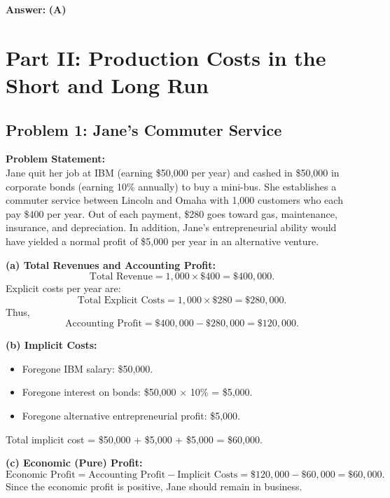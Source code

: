 \documentclass[12pt]{article}
\begin{document}
\textbf{Answer:} \textbf{(A)}

\section*{Part II: Production Costs in the Short and Long Run}

\subsection*{Problem 1: Jane's Commuter Service}
\textbf{Problem Statement:} \\
Jane quit her job at IBM (earning \$50,000 per year) and cashed in \$50,000 in corporate bonds (earning 10\% annually) to buy a mini-bus. She establishes a commuter service between Lincoln and Omaha with 1,000 customers who each pay \$400 per year. Out of each payment, \$280 goes toward gas, maintenance, insurance, and depreciation. In addition, Jane’s entrepreneurial ability would have yielded a normal profit of \$5,000 per year in an alternative venture.
\medskip

\textbf{(a) Total Revenues and Accounting Profit:} \\
\[
  \text{Total Revenue} = 1{,}000 \times \$400 = \$400{,}000.
\]
Explicit costs per year are:
\[
  \text{Total Explicit Costs} = 1{,}000 \times \$280 = \$280{,}000.
\]
Thus,
\[
  \text{Accounting Profit} = \$400{,}000 - \$280{,}000 = \$120{,}000.
\]
\medskip

\textbf{(b) Implicit Costs:} \\
\begin{itemize}[noitemsep]
  \item Foregone IBM salary: \$50,000.
  \item Foregone interest on bonds: \$50,000 $\times$ 10\% = \$5,000.
  \item Foregone alternative entrepreneurial profit: \$5,000.
\end{itemize}
Total implicit cost = \$50,000 + \$5,000 + \$5,000 = \$60,000.
\medskip

\textbf{(c) Economic (Pure) Profit:} \\
\[
  \text{Economic Profit} = \text{Accounting Profit} - \text{Implicit Costs} = \$120{,}000 - \$60{,}000 = \$60{,}000.
\]
Since the economic profit is positive, Jane should remain in business.

\bigskip
\end{document}
